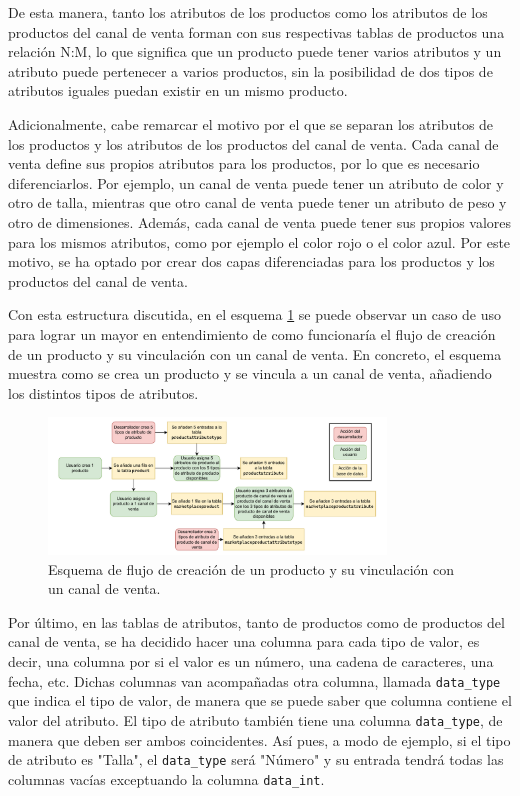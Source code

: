 De esta manera, tanto los atributos de los productos como los atributos de los productos del canal de venta forman con sus respectivas tablas de productos una relación N:M, lo que significa que un producto puede tener varios atributos y un atributo puede pertenecer a varios productos, sin la posibilidad de dos tipos de atributos iguales puedan existir en un mismo producto.

Adicionalmente, cabe remarcar el motivo por el que se separan los atributos de los productos y los atributos de los productos del canal de venta. Cada canal de venta define sus propios atributos para los productos, por lo que es necesario diferenciarlos. Por ejemplo, un canal de venta puede tener un atributo de color y otro de talla, mientras que otro canal de venta puede tener un atributo de peso y otro de dimensiones. Además, cada canal de venta puede tener sus propios valores para los mismos atributos, como por ejemplo el color rojo o el color azul. Por este motivo, se ha optado por crear dos capas diferenciadas para los productos y los productos del canal de venta.

Con esta estructura discutida, en el esquema \ref{fig:products_db_diagram} se puede observar un caso de uso para lograr un mayor en entendimiento de como funcionaría el flujo de creación de un producto y su vinculación con un canal de venta. En concreto, el esquema muestra como se crea un producto y se vincula a un canal de venta, añadiendo los distintos tipos de atributos.

\begin{figure}[H]
    \centering
    \includegraphics[width=0.8\textwidth]{figures/design_develop/products_db_diagram.pdf}
    \caption{Esquema de flujo de creación de un producto y su vinculación con un canal de venta.}
    \label{fig:products_db_diagram}
\end{figure}

Por último, en las tablas de atributos, tanto de productos como de productos del canal de venta, se ha decidido hacer una columna para cada tipo de valor, es decir, una columna por si el valor es un número, una cadena de caracteres, una fecha, etc. Dichas columnas van acompañadas otra columna, llamada \texttt{data\_type} que indica el tipo de valor, de manera que se puede saber que columna contiene el valor del atributo. El tipo de atributo también tiene una columna \texttt{data\_type}, de manera que deben ser ambos coincidentes. Así pues, a modo de ejemplo, si el tipo de atributo es "Talla", el \texttt{data\_type} será "Número" y su entrada tendrá todas las columnas vacías exceptuando la columna \texttt{data\_int}.

